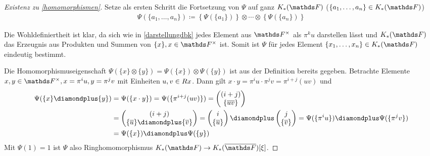 \documentclass[ngerman,fontsize=11pt, paper=a4, parskip=half, titlepage=true, toc=bib]{scrartcl}
\begin{document}
\begin{proof}[Existenz zu \ref{homomorphismen}]
  Setze als ersten Schritt die Fortsetzung von $\Psi$ auf ganz $\KF$
  ($\{a_1,\dotsc,a_n\}\in\KF$)
  \begin{gather*}
    \Psi(\{a_1,\dotsc,a_n\})
    \coloneqq \left\{\Psi(\{a_1\})\right\}\otimes\dotsb
    \otimes \left\{\Psi(\{a_n\})\right\}
  \end{gather*}

  Die Wohldefiniertheit ist klar, da sich wie in \ref{darstellungdbk}
  jedes Element aus $\Fx$ als $\pi^k u$ darstellen lässt und
  $\KF$ das Erzeugnis aus Produkten und Summen von $\{x\}, x\in\Fx$
  ist. Somit ist $\Psi$ für jedes Element $\{x_1,\dotsc,x_n\}\in\KF$ 
  eindeutig bestimmt.

  Die Homomorphismuseigenschaft
  $\Psi(\{x\}\otimes\{y\})=\Psi(\{x\})\otimes\Psi(\{y\})$
  ist aus der Definition bereits gegeben.
  Betrachte Elemente $x,y\in\Fx, x=\pi^iu, y=\pi^jv$ mit Einheiten
  $u,v\in\\Rx$. 
  Dann gilt $x\cdot y=\pi^iu\cdot\pi^jv=\pi^{i+j}(uv)$  und
  \begin{align*}
    \Psi(\{x\}\p\{y\})
    &=\Psi(\{x\cdot y\})=\Psi(\{\pi^{i+j}(uv)\})
      =\begin{pmatrix}(i+j)\\\{\ov{uv}\}\end{pmatrix}\\
    &=\begin{pmatrix}(i+j)\\\{\ov u \}\p \{\ov v\}\end{pmatrix}
    = \begin{pmatrix}i\\\{\ov u\}\end{pmatrix}
    \p\begin{pmatrix}j\\\{\ov v\}\end{pmatrix}
    =\Psi(\{\pi^iu\})\p \Psi(\{\pi^jv\})\\
    &= \Psi(\{x\})\p\Psi(\{y\})
  \end{align*}
  Mit $\Psi(1)=1$ ist $\Psi$ also Ringhomomorphismus $\KF\to\KbF[\xi]$.


\end{proof}
\end{document}
